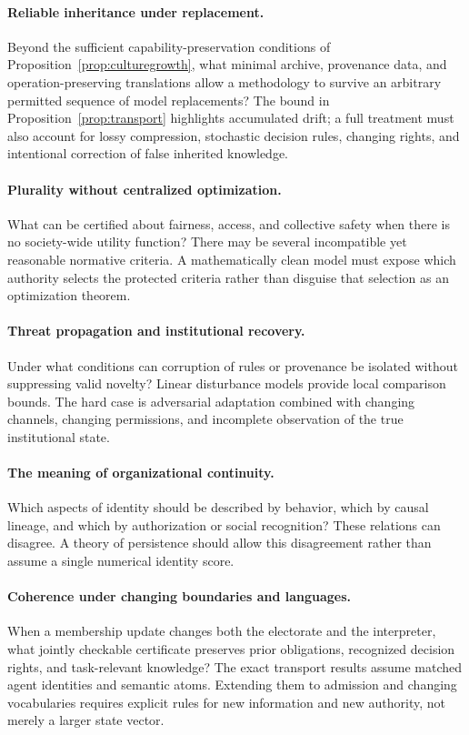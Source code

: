 \documentclass[11pt,letterpaper]{article}
\theoremstyle{plain}
\theoremstyle{definition}
\theoremstyle{remark}
\begin{document}
\paragraph{Reliable inheritance under replacement.}
Beyond the sufficient capability-preservation conditions of Proposition~\ref{prop:culturegrowth}, what minimal archive, provenance data, and operation-preserving translations allow a methodology to survive an arbitrary permitted sequence of model replacements? The bound in Proposition~\ref{prop:transport} highlights accumulated drift; a full treatment must also account for lossy compression, stochastic decision rules, changing rights, and intentional correction of false inherited knowledge.

\paragraph{Plurality without centralized optimization.}
What can be certified about fairness, access, and collective safety when there is no society-wide utility function? There may be several incompatible yet reasonable normative criteria. A mathematically clean model must expose which authority selects the protected criteria rather than disguise that selection as an optimization theorem.

\paragraph{Threat propagation and institutional recovery.}
Under what conditions can corruption of rules or provenance be isolated without suppressing valid novelty? Linear disturbance models provide local comparison bounds. The hard case is adversarial adaptation combined with changing channels, changing permissions, and incomplete observation of the true institutional state.

\paragraph{The meaning of organizational continuity.}
Which aspects of identity should be described by behavior, which by causal lineage, and which by authorization or social recognition? These relations can disagree. A theory of persistence should allow this disagreement rather than assume a single numerical identity score.

\paragraph{Coherence under changing boundaries and languages.}
When a membership update changes both the electorate and the interpreter, what jointly checkable certificate preserves prior obligations, recognized decision rights, and task-relevant knowledge? The exact transport results assume matched agent identities and semantic atoms. Extending them to admission and changing vocabularies requires explicit rules for new information and new authority, not merely a larger state vector.
\end{document}
